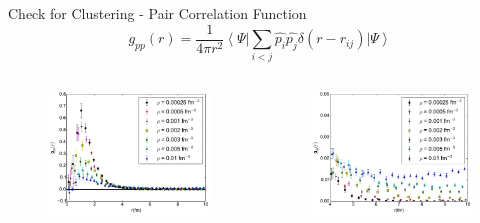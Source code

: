 \documentclass{beamer}
\newcommand{\ket}[1]{\left| #1 \right>}
\newcommand{\bra}[1]{\left< #1 \right|}
\begin{document}
\begin{frame}{Check for Clustering - Pair Correlation Function}
\begin{equation*}
   g_{pp}(r) = \frac{1}{4\pi r^2} \bra{\Psi}\sum\limits_{i<j}\hat{p_i}\hat{p_j}\delta(r-r_{ij})\ket{\Psi}
\end{equation*}
\vspace{-0.7cm}
\begin{columns}
\begin{column}{0.6\textwidth}
\begin{figure}[h!]
   \centering
   \includegraphics[width=1.05\textwidth]{../figures/gpp.pdf}
\end{figure}
\end{column}
\begin{column}{0.4\textwidth}
\begin{figure}[h!]
   \centering
   \includegraphics[width=\textwidth]{../figures/gpp_small.pdf}

\end{figure}
\end{column}
\end{columns}
\end{frame}
\end{document}
